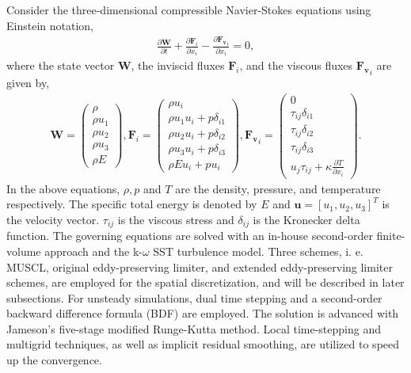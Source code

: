 Consider the three-dimensional compressible Navier-Stokes equations using Einstein notation,
\begin{align} 
   \frac{\partial \mathbf{W}}{\partial t}+\frac{\partial \mathbf{F}_{i}}{\partial x_{i}} -\frac{\partial \mathbf{F_{v}}_{i}}{\partial x_{i}}=0,
\end{align}
where the state vector $\mathbf{W}$, the inviscid fluxes $\mathbf{F}_{i}$, and the viscous fluxes $\mathbf{F_{v}}_{i}$ are given by,
\begin{align} 
\mathbf{W} = \begin{pmatrix}
\rho\\ 
\rho u_{1}\\ 
\rho u_{2}\\ 
\rho u_{3}\\ 
\rho E
\end{pmatrix}, 
\mathbf{F}_{i} = \begin{pmatrix}
\rho u_{i}\\ 
\rho u_{1}u_{i}+p\delta_{i1}\\ 
\rho u_{2}u_{i}+p\delta_{i2}\\ 
\rho u_{3}u_{i}+p\delta_{i3}\\ 
\rho Eu_{i} + pu_{i}
\end{pmatrix}, 
\mathbf{F_{v}}_{i}=\begin{pmatrix}
0\\ 
\tau_{ij}\delta_{i1}\\ 
\tau_{ij}\delta_{i2}\\ 
\tau_{ij}\delta_{i3}\\ 
u_{j}\tau_{ij}+\kappa \frac{\partial T}{\partial x_{i}}
\end{pmatrix}.
\end{align}
In the above equations, $\rho, p$ and $T$ are the density, pressure, and temperature respectively. The specific total energy is denoted by $E$ and $\mathbf{u}=[u_{1}, u_{2}, u_{3}]^{T}$ is the velocity vector. $\tau_{ij}$ is the viscous stress and $\delta_{ij}$ is the Kronecker delta function. The governing equations are solved with an in-house second-order finite-volume approach and the k-$\omega$ SST turbulence model. Three schemes, i. e. MUSCL, original eddy-preserving limiter, and extended eddy-preserving limiter schemes, are employed for the spatial discretization, and will be described in later subsections. For unsteady simulations, dual time stepping and a second-order backward difference formula (BDF) are employed. The solution is advanced with Jameson's five-stage modified Runge-Kutta method. Local time-stepping and multigrid techniques, as well as implicit residual smoothing, are utilized to speed up the convergence. 



